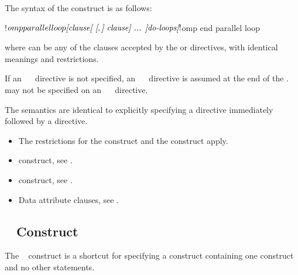 \begin{fortranspecific}
The syntax of the   construct is as follows:

\begin{ompfPragma}
!$omp parallel loop \plc{[clause[ [},\plc{] clause] ... ]}
   \plc{do-loops}
\plc{[}!$omp end parallel loop\plc{]}
\end{ompfPragma}

where  can be any of the clauses accepted by the  or
   directives, with identical meanings and restrictions.

If an ~~ directive is not specified, an
~~ directive is assumed at the end of the
.  may not be specified on an
~~ directive.
\end{fortranspecific}

\descr
The semantics are identical to explicitly specifying a  directive 
immediately followed by a  directive. 

\restrictions
\begin{itemize}
\item The restrictions for the  construct and the
   construct apply.
\end{itemize}

\crossreferences
\begin{itemize}
\item {} construct, see
.

\item {} construct, see
.

\item Data attribute clauses, see
.
\end{itemize}




\subsection{~ Construct}
\label{subsec:parallel sections Construct}
\summary
The ~ construct is a shortcut for specifying a 
 construct containing one  construct and no other 
statements.

